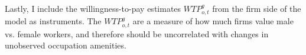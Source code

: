 \documentclass[12pt]{article}
\begin{document}








Lastly, I include the willingness-to-pay estimates $WTP^g_{o,t}$ from the firm side of the model as instruments. The $WTP^g_{o,t}$ are a measure of how much firms value male vs. female workers, and therefore should be uncorrelated with changes in unobserved occupation amenities.
\end{document}
